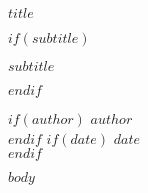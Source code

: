 \documentclass[12pt,svgnames]{article}
\begin{document}
\begin{Huge}
  \textbf{\textsf{$title$}}
\end{Huge}

$if(subtitle)$
\begin{Large}
  \textsf{$subtitle$}
\end{Large}
$endif$

\textsf{%
  $if(author)$ $author$ \\ $endif$
  $if(date)$ $date$ \\ $endif$
}

\bigskip

$body$
\end{document}
